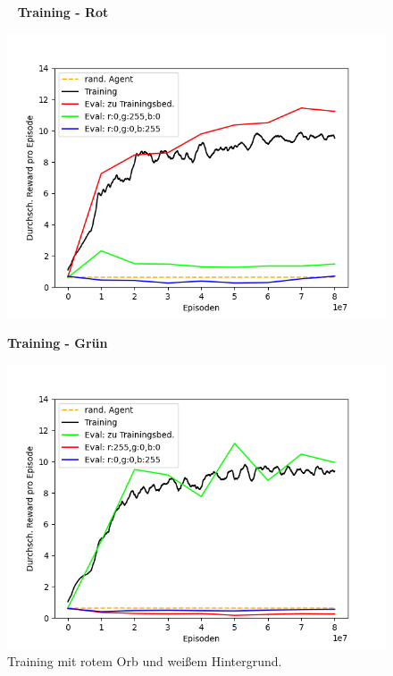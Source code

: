 \begin{figure}[htp!]
   \centering
   \captionsetup{width=0.48\linewidth} 
    \begin{minipage}{0.48\linewidth}
        \centering\
        \textbf{Training - Rot}\par
        \includegraphics[scale=.5]{abb/_graphen/floor_80Mio_inflvl_15_act_TrainingRot_evalRGB_white}
        \caption{Training mit rotem Orb und weißem Hintergrund.}
        \label{fig:grph_red_80Mio_200lvl_15act_Training_evalAsTraining_white}
    \end{minipage}
    \centering
    \begin{minipage}{0.48\linewidth}
        \centering
        \textbf{Training - Grün}\par%
        \includegraphics[scale=0.5]{abb/_graphen/floor_80Mio_inflvl_15_act_TrainingGreen_evalRGB_white} 

\end{minipage}
\end{figure}
